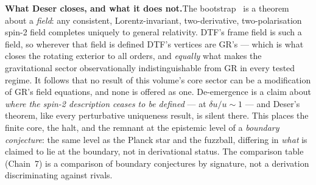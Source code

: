 \documentclass[11pt]{article}
\begin{document}
\begin{tcolorbox}[keybox]
\textbf{What Deser closes, and what it does not.}\enspace The bootstrap~\cite{Deser1970} is a theorem about
a \emph{field}: any consistent, Lorentz-invariant, two-derivative, two-polarisation spin-2 field completes
uniquely to general relativity. DTF's frame field is such a field, so wherever that field is defined DTF's
vertices are GR's --- which is what closes the rotating exterior to all orders, and \emph{equally} what
makes the gravitational sector observationally indistinguishable from GR in every tested regime. It follows
that no result of this volume's core sector can be a modification of GR's field equations, and none is
offered as one. De-emergence is a claim about \emph{where the spin-2 description ceases to be defined} ---
at $\delta u/u\sim1$ --- and Deser's theorem, like every perturbative uniqueness result, is silent there.
This places the finite core, the halt, and the remnant at the epistemic level of a \emph{boundary
conjecture}: the same level as the Planck star and the fuzzball, differing in \emph{what} is claimed to lie
at the boundary, not in derivational status. The comparison table (Chain~7) is a comparison of boundary
conjectures by signature, not a derivation discriminating against rivals.
\end{tcolorbox}
\end{document}
